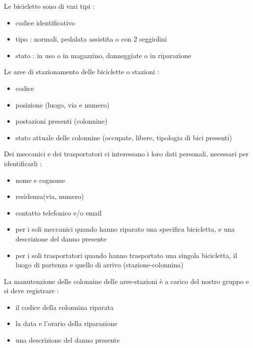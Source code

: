 \documentclass[a4paper,twoside]{article}
\begin{document}
Le biciclette sono di vari tipi :
\begin{itemize}
 \item codice identificativo
 \item tipo : normali, pedalata assistita o con 2 seggiolini
 \item stato : in uso o in magazzino, danneggiate o in riparazione
\end{itemize}
Le aree di stazionamento delle biciclette o stazioni :
\begin{itemize}
 \item codice
 \item posizione (luogo, via e numero)
 \item postazioni presenti (colonnine)
 \item stato attuale delle colonnine (occupate, libere, tipologia di bici presenti)
\end{itemize}
Dei meccanici e dei trasportatori ci interessano i loro dati personali, necessari per identificarli :
\begin{itemize}
 \item nome e cognome
 \item residenza(via, numero)
 \item contatto telefonico e/o email
 \item per i soli meccanici quando hanno riparato una specifica bicicletta, e una descrizione del danno presente
 \item per i soli trasportatori quando hanno trasportato una singola bicicletta, il luogo di partenza e quello di arrivo (stazione-colonnina)
\end{itemize}
La manutenzione delle colonnine delle aree-stazioni è a carico del nostro gruppo e si deve registrare :
\begin{itemize}
 \item il codice della colonnina riparata
 \item la data e l'orario della riparazione
 \item una descrizione del danno presente
\end{itemize}
\end{document}
